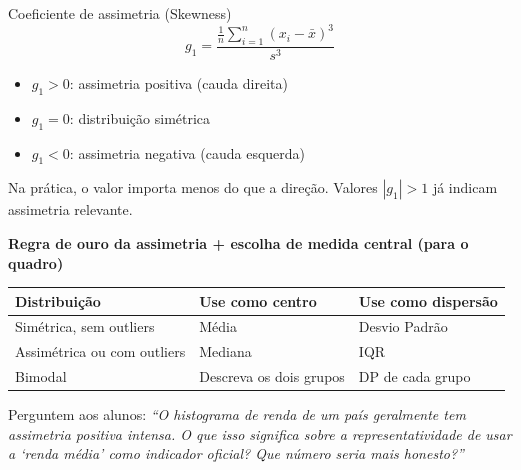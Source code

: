 \begin{FormulaBox}{Coeficiente de assimetria (Skewness)}
\[
g_1 = \frac{\frac{1}{n}\sum_{i=1}^{n}(x_i - \bar{x})^3}{s^3}
\]
\begin{itemize}
  \item $g_1 > 0$: assimetria positiva (cauda direita)
  \item $g_1 = 0$: distribuição simétrica
  \item $g_1 < 0$: assimetria negativa (cauda esquerda)
\end{itemize}
Na prática, o valor importa menos do que a direção. Valores $|g_1| > 1$
já indicam assimetria relevante.
\end{FormulaBox}

\begin{BoardBox}
\textbf{Regra de ouro da assimetria + escolha de medida central (para o quadro)}
\begin{tabular}{|l|l|l|}
\hline
\textbf{Distribuição} & \textbf{Use como centro} & \textbf{Use como dispersão} \\
\hline
Simétrica, sem outliers & Média & Desvio Padrão \\
Assimétrica ou com outliers & Mediana & IQR \\
Bimodal & Descreva os dois grupos & DP de cada grupo \\
\hline
\end{tabular}
\end{BoardBox}

Perguntem aos alunos: \textit{``O histograma de renda de um país geralmente
tem assimetria positiva intensa. O que isso significa sobre a representatividade
de usar a `renda média' como indicador oficial? Que número seria mais honesto?''}

